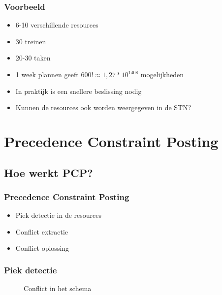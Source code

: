\documentclass{beamer}
\theoremstyle{definition}
\newcommand{\inputtikz}[1]{}
\begin{document}
\begin{frame}
	\frametitle{Voorbeeld}
	\begin{itemize}
		\item 6-10 verschillende resources
		\item 30 treinen
		\item 20-30 taken
		\item<2-> 1 week plannen geeft \textbf{$600! \approx 1,27 * 10^{1408}$} mogelijkheden
		\item<3-> In praktijk is een snellere beslissing nodig
		\item<3-> Kunnen de resources ook worden weergegeven in de STN?
	\end{itemize}
\end{frame}

\section{Precedence Constraint Posting}


\subsection{Hoe werkt PCP?}
\begin{frame}
	\frametitle{Precedence Constraint Posting}
	\begin{itemize}
		\item Piek detectie in de resources
		\item Conflict extractie
		\item Conflict oplossing
	\end{itemize}
\end{frame}

\begin{frame}
	\frametitle{Piek detectie}
	\vspace{-1.2em}
	\begin{figure}[ht]
		\makebox[\textwidth][c]{\resizebox{.36\paperwidth}{!}{
			\inputtikz{schedule_infeasible_colored_profile}
		}}
		\vspace{-1.3em}
		\caption{Conflict in het schema}
	\end{figure}
\end{frame}
\end{document}
